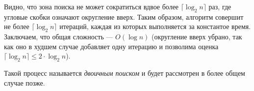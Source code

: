 Видно, что зона поиска не может сократиться вдвое более $\lceil\log_2{n}\rceil$ раз, где угловые скобки означают округление вверх. Таким образом, алгоритм совершит не более $\lceil\log_2{n}\rceil$ итераций, каждая из которых выполняется за константое время. Заключаем, что общая сложность --- $O(\log{n})$ (округление вверх убрано, так как оно в худшем случае добавляет одну итерацию и позволима оценка $\lceil\log_2{n}\rceil \le 2 \cdot \log_2{n}$).

Такой процесс называется \emph{двоичным поиском} и будет рассмотрен в более общем случае позже.